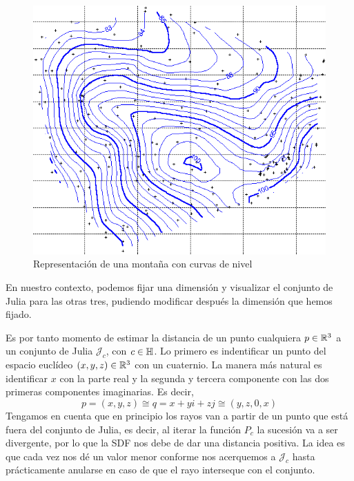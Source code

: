 \begin{figure} [ht]
    \centering
    \includegraphics[scale = 0.3]{img/C8/curvas-de-nivel2.png}
    \caption{Representación de una montaña con curvas de nivel}
    \label{fig:curva-de-nivel}
\end{figure}

En nuestro contexto, podemos fijar una dimensión y visualizar el conjunto de Julia para las otras tres, pudiendo modificar después la dimensión que hemos fijado. 

Es por tanto momento de estimar la distancia de un punto cualquiera $p\in\mathbb{R}^3$ a un conjunto de Julia $\mathcal{J}_c$, con $c\in\mathbb{H}$. Lo primero es indentificar un punto del espacio euclídeo $(x,y,z)\in\mathbb{R}^3$ con un cuaternio. La manera más natural es identificar $x$ con la parte real y la segunda y tercera componente con las dos primeras componentes imaginarias. Es decir,
\begin{equation}
    p=(x,y,z)\cong q = x + yi + zj \cong (y,z,0,x)
\end{equation}
Tengamos en cuenta que en principio los rayos van a partir de un punto que está fuera del conjunto de Julia, es decir, al iterar la función $P_c$ la sucesión va a ser divergente, por lo que la SDF nos debe de dar una distancia positiva. La idea es que cada vez nos dé un valor menor conforme nos acerquemos a $\mathcal{J}_c$ hasta prácticamente anularse en caso de que el rayo interseque con el conjunto. 

